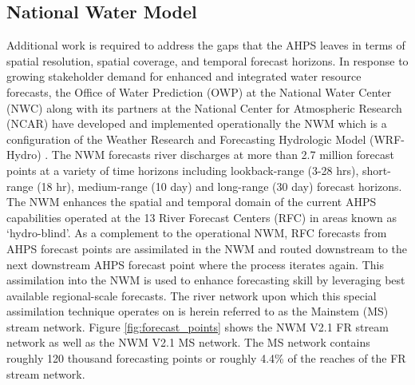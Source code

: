 \subsection{National Water Model}
\label{ssec:national_water_model}
%
Additional work is required to address the gaps that the AHPS leaves in terms of spatial resolution, spatial coverage, and temporal forecast horizons.
In response to growing stakeholder demand for enhanced and integrated water resource forecasts, the Office of Water Prediction (OWP) at the National Water Center (NWC) along with its partners at the National Center for Atmospheric Research (NCAR) have developed and implemented operationally the NWM which is a configuration of the Weather Research and Forecasting Hydrologic Model (WRF-Hydro) \cite{salas2018towards,gochis2021wrf,cosgrove2019evolution}. 
The NWM forecasts river discharges at more than 2.7 million forecast points at a variety of time horizons including lookback-range (3-28 hrs), short-range (18 hr), medium-range (10 day) and long-range (30 day) forecast horizons.
The NWM enhances the spatial and temporal domain of the current AHPS capabilities operated at the 13 River Forecast Centers (RFC) in areas known as `hydro-blind'.
As a complement to the operational NWM, RFC forecasts from AHPS forecast points are assimilated in the NWM and routed downstream to the next downstream AHPS forecast point where the process iterates again.
This assimilation into the NWM is used to enhance forecasting skill by leveraging best available regional-scale forecasts.
The river network upon which this special assimilation technique operates on is herein referred to as the Mainstem (MS) stream network.
Figure \ref{fig:forecast_points} shows the NWM V2.1 FR stream network as well as the NWM V2.1 MS network.
The MS network contains roughly 120 thousand forecasting points or roughly 4.4\% of the reaches of the FR stream network.

